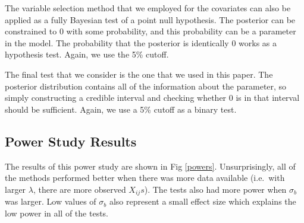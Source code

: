 \documentclass[10pt,letterpaper]{article}
\begin{document}
The variable selection method that we employed for the covariates can
also be applied as a fully Bayesian test of a point null hypothesis. The
posterior can be constrained to 0 with some probability, and this
probability can be a parameter in the model. The probability that the
posterior is identically 0 works as a hypothesis test. Again, we use the
5\% cutoff.

The final test that we consider is the one that we used in this paper.
The posterior distribution contains all of the information about the
parameter, so simply constructing a credible interval and checking
whether 0 is in that interval should be sufficient. Again, we use a 5\%
cutoff as a binary test.

\hypertarget{power-study-results}{%
\subsection{Power Study Results}\label{power-study-results}}

The results of this power study are shown in Fig \ref{powers}.
Unsurprisingly, all of the methods performed better when there was more
data available (i.e.~with larger \(\lambda\), there are more observed $X_{ij}s$). The tests also had more
power when \(\sigma_b\) was larger.
Low values of $\sigma_b$ also represent a small effect size which explains the low power in all of the tests.
\end{document}
